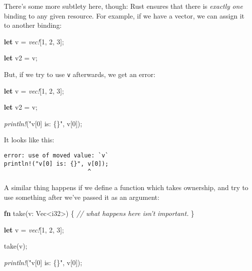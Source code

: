 \documentclass[a4paper,]{book}
\newenvironment{Shaded}{\begin{snugshade}}{\end{snugshade}}
\newcommand{\KeywordTok}[1]{\textcolor[rgb]{0.13,0.29,0.53}{\textbf{{#1}}}}
\newcommand{\DataTypeTok}[1]{\textcolor[rgb]{0.13,0.29,0.53}{{#1}}}
\newcommand{\DecValTok}[1]{\textcolor[rgb]{0.00,0.00,0.81}{{#1}}}
\newcommand{\StringTok}[1]{\textcolor[rgb]{0.31,0.60,0.02}{{#1}}}
\newcommand{\CommentTok}[1]{\textcolor[rgb]{0.56,0.35,0.01}{\textit{{#1}}}}
\newcommand{\PreprocessorTok}[1]{\textcolor[rgb]{0.56,0.35,0.01}{\textit{{#1}}}}
\newcommand{\NormalTok}[1]{{#1}}
\begin{document}

There's some more subtlety here, though: Rust ensures that there is
\emph{exactly one} binding to any given resource. For example, if we
have a vector, we can assign it to another binding:

\begin{Shaded}
\begin{Highlighting}[]
\KeywordTok{let} \NormalTok{v = }\PreprocessorTok{vec!}\NormalTok{[}\DecValTok{1}\NormalTok{, }\DecValTok{2}\NormalTok{, }\DecValTok{3}\NormalTok{];}

\KeywordTok{let} \NormalTok{v2 = v;}
\end{Highlighting}
\end{Shaded}

But, if we try to use \texttt{v} afterwards, we get an error:

\begin{Shaded}
\begin{Highlighting}[]
\KeywordTok{let} \NormalTok{v = }\PreprocessorTok{vec!}\NormalTok{[}\DecValTok{1}\NormalTok{, }\DecValTok{2}\NormalTok{, }\DecValTok{3}\NormalTok{];}

\KeywordTok{let} \NormalTok{v2 = v;}

\PreprocessorTok{println!}\NormalTok{(}\StringTok{"v[0] is: \{\}"}\NormalTok{, v[}\DecValTok{0}\NormalTok{]);}
\end{Highlighting}
\end{Shaded}

It looks like this:

\begin{verbatim}
error: use of moved value: `v`
println!("v[0] is: {}", v[0]);
                        ^
\end{verbatim}

A similar thing happens if we define a function which takes ownership,
and try to use something after we've passed it as an argument:

\begin{Shaded}
\begin{Highlighting}[]
\KeywordTok{fn} \NormalTok{take(v: }\DataTypeTok{Vec}\NormalTok{<}\DataTypeTok{i32}\NormalTok{>) \{}
    \CommentTok{// what happens here isn’t important.}
\NormalTok{\}}

\KeywordTok{let} \NormalTok{v = }\PreprocessorTok{vec!}\NormalTok{[}\DecValTok{1}\NormalTok{, }\DecValTok{2}\NormalTok{, }\DecValTok{3}\NormalTok{];}

\NormalTok{take(v);}

\PreprocessorTok{println!}\NormalTok{(}\StringTok{"v[0] is: \{\}"}\NormalTok{, v[}\DecValTok{0}\NormalTok{]);}
\end{Highlighting}
\end{Shaded}
\end{document}

